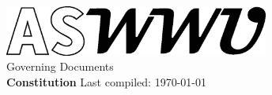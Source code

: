 \documentclass[10pt, letterpaper]{article}
\begin{document}
\nolinenumbers
\begin{titlepage}
    \begin{center}
        \vspace*{5cm}
  		\includegraphics[width=0.65\textwidth]{Formatting/Logo_ASWWU-Black}\\
        \LARGE Governing Documents\\ \Huge \textbf{Constitution}
        \vfill
        \normalsize Last compiled: \today\ \currenttime
             
    \end{center}
 \end{titlepage}
\setcounter{tocdepth}{2}
\tableofcontents
\linenumbers
\newpage
\end{document}
